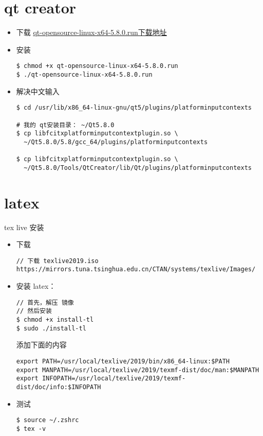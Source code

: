 \section{qt creator}
\begin{itemize}
\item 下载
\href{http://iso.mirrors.ustc.edu.cn/qtproject/archive/qt/5.8/5.8.0/qt-opensource-linux-x64-5.8.0.run}{qt-opensource-linux-x64-5.8.0.run下载地址}

\item 安装
\begin{lstlisting}
$ chmod +x qt-opensource-linux-x64-5.8.0.run 
$ ./qt-opensource-linux-x64-5.8.0.run 
\end{lstlisting}

\item 解决中文输入
\begin{lstlisting}
$ cd /usr/lib/x86_64-linux-gnu/qt5/plugins/platforminputcontexts

# 我的 qt安装目录： ~/Qt5.8.0
$ cp libfcitxplatforminputcontextplugin.so \
  ~/Qt5.8.0/5.8/gcc_64/plugins/platforminputcontexts

$ cp libfcitxplatforminputcontextplugin.so \
  ~/Qt5.8.0/Tools/QtCreator/lib/Qt/plugins/platforminputcontexts
\end{lstlisting}
\end{itemize}
\newpage

\section{latex}
tex live 安装 \\

\begin{itemize}
\item 下载
\begin{lstlisting}
// 下载 texlive2019.iso
https://mirrors.tuna.tsinghua.edu.cn/CTAN/systems/texlive/Images/
\end{lstlisting}

\item 安装 latex：
\begin{lstlisting}
// 首先，解压 镜像
// 然后安装
$ chmod +x install-tl
$ sudo ./install-tl
\end{lstlisting}

添加下面的内容
\begin{lstlisting}
export PATH=/usr/local/texlive/2019/bin/x86_64-linux:$PATH
export MANPATH=/usr/local/texlive/2019/texmf-dist/doc/man:$MANPATH
export INFOPATH=/usr/local/texlive/2019/texmf-dist/doc/info:$INFOPATH
\end{lstlisting}

\item 测试
\begin{lstlisting}
$ source ~/.zshrc
$ tex -v
\end{lstlisting}
\end{itemize}


